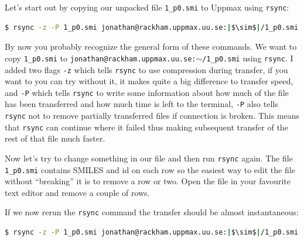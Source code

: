 \documentclass[watermark]{pbpreprint}
\begin{document}
Let's start out by copying our unpacked file \texttt{1\_p0.smi} to Uppmax using
\texttt{rsync}:
%
\begin{lstlisting}[language=bash,escapechar={|},basicstyle=\ttfamily\footnotesize]
$ rsync -z -P 1_p0.smi jonathan@rackham.uppmax.uu.se:|$\sim$|/1_p0.smi
\end{lstlisting}
By now you probably recognize the general form of these commands. We want to
copy \texttt{1\_p0.smi} to \texttt{jonathan@rackham.uppmax.uu.se:$\sim$/1\_p0.smi}
using \texttt{rsync}.  I added two flags \texttt{-z} which
tells \texttt{rsync} to use compression during transfer, if you want to you can
try without it, it makes quite a big difference to transfer speed, and
\texttt{-P} which tells \texttt{rsync} to write some information about how much
of the file has been transferred and how much time is left to the terminal,
\texttt{-P} also tells \texttt{rsync} not to remove partially transferred files
if connection is broken. This means that \texttt{rsync} can continue where it
failed thus making subsequent transfer of the rest of that file much faster. 

Now let's try to change something in our file and then run \texttt{rsync}
again. The file \texttt{1\_p0.smi} contains SMILES and id on each row so the
easiest way to edit the file without ``breaking'' it is to remove a row or two.
Open the file in your favourite text editor and remove a couple of rows.

If we now rerun the \texttt{rsync} command the transfer should be almost
instantaneous:
%
\begin{lstlisting}[language=bash,escapechar={|},basicstyle=\ttfamily\footnotesize]
$ rsync -z -P 1_p0.smi jonathan@rackham.uppmax.uu.se:|$\sim$|/1_p0.smi
\end{lstlisting}
\end{document}
